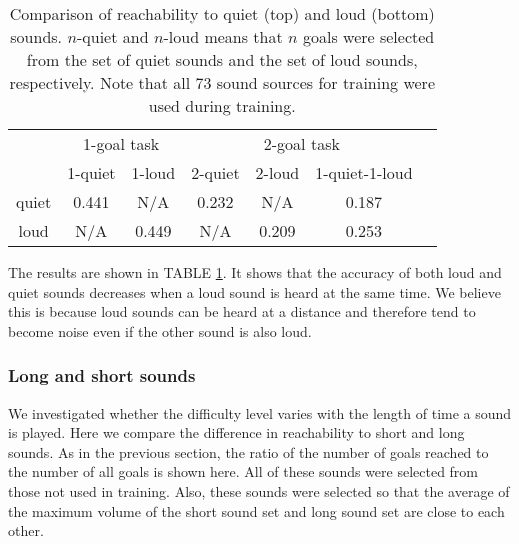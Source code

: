 \begin{table}[tb]
    \caption{
        Comparison of reachability to quiet (top) and loud (bottom) sounds.
        $n$-quiet and $n$-loud means that $n$ goals were selected from the set of quiet sounds and the set of loud sounds, respectively.
        Note that all 73 sound sources for training were used during training.
    }
    \label{tab:loud_and_quiet}
    \centering
    \begin{tabular}{@{}ccccccc@{}}
      \toprule
      & \multicolumn{2}{c}{1-goal task} & \multicolumn{3}{c}{2-goal task} \\
      \cmidrule(lr){2-3} \cmidrule(lr){4-6}
      & 1-quiet & 1-loud & 2-quiet & 2-loud & 1-quiet-1-loud \\ \midrule
      quiet & 0.441 & N/A & 0.232 & N/A & 0.187 \\
      loud & N/A & 0.449 & N/A & 0.209 & 0.253 \\
      \bottomrule
    \end{tabular}
\end{table}

The results are shown in TABLE \ref{tab:loud_and_quiet}.
It shows that the accuracy of both loud and quiet sounds decreases when a loud sound is heard at the same time.
We believe this is because loud sounds can be heard at a distance and therefore tend to become noise even if the other sound is also loud.





\subsubsection{Long and short sounds}

We investigated whether the difficulty level varies with the length of time a sound is played.
Here we compare the difference in reachability to short and long sounds.
As in the previous section, the ratio of the number of goals reached to the number of all goals is shown here. 
All of these sounds were selected from those not used in training.
Also, these sounds were selected so that the average of the maximum volume of the short sound set and long sound set are close to each other.

